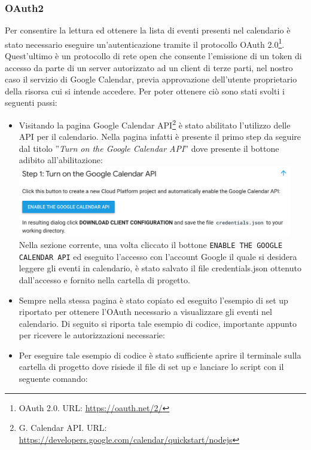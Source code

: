 \subsubsection{OAuth2}
Per consentire la lettura ed ottenere la lista di eventi presenti nel calendario è stato necessario eseguire un'autenticazione tramite il protocollo OAuth 2.0\footnote{OAuth 2.0. URL: \href{https://oauth.net/2/}{https://oauth.net/2/}}. Quest'ultimo è un protocollo di rete open che consente l'emissione di un token di accesso da parte di un server autorizzato ad un client di terze parti, nel nostro caso il servizio di Google Calendar, previa approvazione dell'utente proprietario della risorsa cui si intende accedere. Per poter ottenere ciò sono stati svolti i seguenti passi:
\begin{itemize}
    \item Visitando la pagina Google Calendar API\footnote{G. Calendar API. URL: \href{https://developers.google.com/calendar/quickstart/nodejs}{https://developers.google.com/calendar/quickstart/nodejs}} è stato abilitato l'utilizzo delle API per il calendario. Nella pagina infatti è presente il primo step da seguire dal titolo ”\textit{Turn on the Google Calendar API}” dove presente il bottone adibito all'abilitazione:\\
    \includegraphics[width=12cm]{immagini/google_calendar_api.png}\\[2cm]
    Nella sezione corrente, una volta cliccato il bottone \texttt{ENABLE THE GOOGLE CALENDAR API} ed eseguito l’accesso con l’account Google il quale si desidera leggere gli eventi in calendario, è stato salvato il file credentials.json ottenuto dall'accesso e fornito nella cartella di progetto.
    \item Sempre nella stessa pagina è stato copiato ed eseguito l'esempio di set up riportato per ottenere l’OAuth necessario a visualizzare gli eventi nel calendario. Di seguito si riporta tale esempio di codice, importante appunto per ricevere le autorizzazioni necessarie:
	
	\item Per eseguire tale esempio di codice è stato sufficiente aprire il terminale sulla cartella di progetto dove risiede il file di set up e lanciare lo script con il seguente comando:

\end{itemize}
